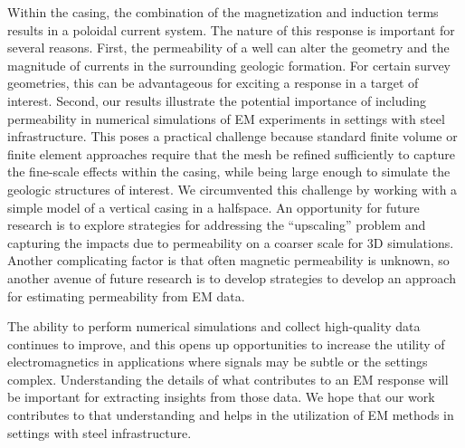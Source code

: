 Within the casing, the combination of the magnetization and induction terms results in a poloidal current system. The nature of this response is important for several reasons. First, the permeability of a well can alter the geometry and the magnitude of currents in the surrounding geologic formation. For certain survey geometries, this can be advantageous for exciting a response in a target of interest. Second, our results illustrate the potential importance of including permeability in numerical simulations of EM experiments in settings with steel infrastructure. This poses a practical challenge because standard finite volume or finite element approaches require that the mesh be refined sufficiently to capture the fine-scale effects within the casing, while being large enough to simulate the geologic structures of interest. We circumvented this challenge by working with a simple model of a vertical casing in a halfspace. An opportunity for future research is to explore strategies for addressing the ``upscaling'' problem and capturing the impacts due to permeability on a coarser scale for 3D simulations. Another complicating factor is that often magnetic permeability is unknown, so another avenue of future research is to develop strategies to develop an approach for estimating permeability from EM data.

The ability to perform numerical simulations and collect high-quality data continues to improve, and this opens up opportunities to increase the utility of electromagnetics in applications where signals may be subtle or the settings complex. Understanding the details of what contributes to an EM response will be important for extracting insights from those data. We hope that our work contributes to that understanding and helps in the utilization of EM methods in settings with steel infrastructure.
